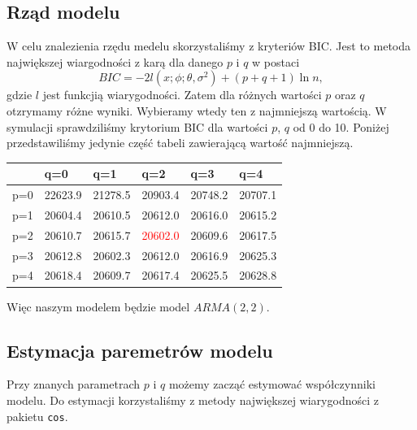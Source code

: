 \documentclass[12pt]{article}
\theoremstyle{exer}
\begin{document}
	\subsection{Rząd modelu}
	W celu znalezienia rzędu medelu skorzystaliśmy z kryteriów BIC. Jest to metoda największej wiargodności z karą dla danego $p$ i $q$ w postaci
	\begin{equation}
		BIC=-2l(x;\phi;\theta,\sigma^2)+(p+q+1)\ln n,
	\end{equation}
	gdzie $l$ jest funkcjią wiarygodności. Zatem dla różnych wartości $p$ oraz $q$ otzrymamy różne wyniki. Wybieramy wtedy ten z najmniejszą wartością. W symulacji sprawdziliśmy krytorium BIC dla wartości $p$, $q$ od 0 do 10. Poniżej przedstawiliśmy jedynie część tabeli zawierającą wartość najmniejszą.
	\begin{table}[H]
		\begin{tabularx}{4\textwidth/5}{|Y|Y|Y|Y|Y|Y|}
			\hline
				&   q=0   &   q=1   &   q=2   &   q=3   &   q=4   \\\hline
			p=0 & 22623.9 & 21278.5 & 20903.4 & 20748.2 & 20707.1 \\\hline
			p=1 & 20604.4 & 20610.5 & 20612.0 & 20616.0 & 20615.2 \\\hline
			p=2 & 20610.7 & 20615.7 & \textcolor{red}{20602.0} & 20609.6 & 20617.5 \\\hline
			p=3 & 20612.8 & 20602.3 & 20612.0 & 20616.9 & 20625.3 \\\hline
			p=4 & 20618.4 & 20609.7 & 20617.4 & 20625.5 & 20628.8 \\\hline
		\end{tabularx}
	\end{table}
	Więc naszym modelem będzie model $ARMA(2,2)$.
	\subsection{Estymacja paremetrów modelu}
	Przy znanych parametrach $p$ i $q$ możemy zacząć estymować współczynniki modelu. Do estymacji korzystaliśmy z metody największej wiarygodności z pakietu \verb*|cos|.
     

	
\end{document}

